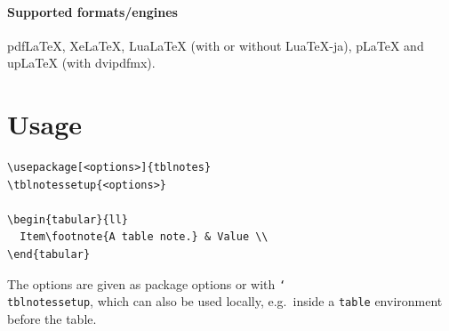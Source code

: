 \documentclass{article}
\newcommand*\cs[1]{\texttt{\char`\\#1}}
\begin{document}
\paragraph{Supported formats/engines}
pdf\LaTeX, Xe\LaTeX, Lua\LaTeX{} (with or without Lua\TeX-ja),
p\LaTeX{} and up\LaTeX{} (with dvipdfmx).

\section{Usage}

\begin{verbatim}
\usepackage[<options>]{tblnotes}
\tblnotessetup{<options>}

\begin{tabular}{ll}
  Item\footnote{A table note.} & Value \\
\end{tabular}
\end{verbatim}

\noindent
The options are given as package options or with \cs{tblnotessetup},
which can also be used locally, e.g.\ inside a \texttt{table}
environment before the table.
\end{document}
